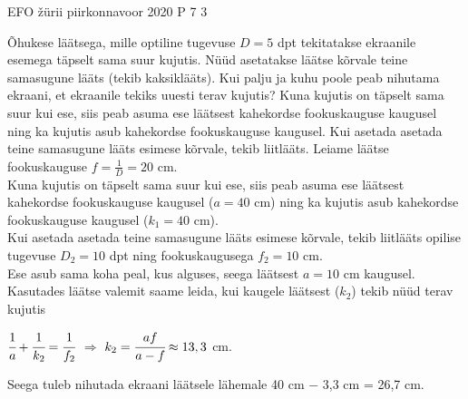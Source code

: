 {EFO žürii} %
{piirkonnavoor} %
{2020} %
{P 7} %
{3} %
{
\ifStatement
Õhukese läätsega, mille optiline tugevuse $D = 5$ dpt tekitatakse ekraanile esemega täpselt sama suur kujutis. Nüüd asetatakse läätse kõrvale teine samasugune lääts (tekib kaksiklääts). Kui palju ja kuhu poole peab nihutama ekraani, et ekraanile tekiks uuesti terav kujutis?
\fi
\ifHint
Kuna kujutis on täpselt sama suur kui ese, siis peab asuma ese läätsest kahekordse fookuskauguse kaugusel ning ka kujutis asub kahekordse fookuskauguse kaugusel. Kui asetada asetada teine samasugune lääts esimese kõrvale, tekib liitlääts.
\fi
\ifSolution
Leiame läätse fookuskauguse $f = \frac{1}{D} = 20$ cm. \\
Kuna kujutis on täpselt sama suur kui ese, siis peab asuma ese läätsest kahekordse fookuskauguse kaugusel ($a = 40$ cm) ning ka kujutis asub kahekordse fookuskauguse kaugusel ($k_1 = 40$ cm). \\
Kui asetada asetada teine samasugune lääts esimese kõrvale, tekib liitlääts opilise tugevuse $D_2 = 10$ dpt ning fookuskaugusega $f_2 = 10$ cm. \\
Ese asub sama koha peal, kus alguses, seega läätsest $a = 10$ cm kaugusel. Kasutades läätse valemit saame leida, kui kaugele läätsest ($k_2$) tekib nüüd terav kujutis
\begin{center}
$\cfrac{1}{a} + \cfrac{1}{k_2} = \cfrac{1}{f_2}$ $\Rightarrow$ $k_2 = \cfrac{af}{a - f} \approx 13,3$ cm.
\end{center}
Seega tuleb nihutada ekraani läätsele lähemale 40 cm $-$ 3,3 cm = 26,7 cm.
\fi
}